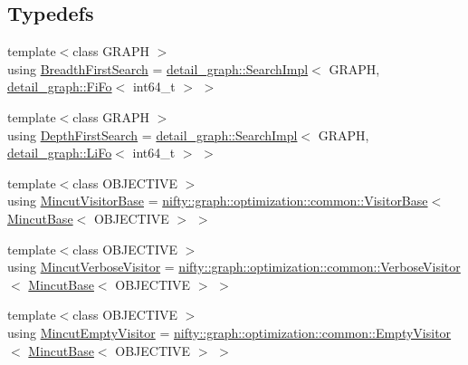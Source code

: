\subsection*{Typedefs}
\begin{DoxyCompactItemize}
\item 
{\footnotesize template$<$class G\+R\+A\+P\+H $>$ }\\using \hyperlink{namespacenifty_1_1graph_a5cdea7eb940a178738d5f7ba11b92a15}{Breadth\+First\+Search} = \hyperlink{classnifty_1_1graph_1_1detail__graph_1_1SearchImpl}{detail\+\_\+graph\+::\+Search\+Impl}$<$ G\+R\+A\+P\+H, \hyperlink{structnifty_1_1graph_1_1detail__graph_1_1FiFo}{detail\+\_\+graph\+::\+Fi\+Fo}$<$ int64\+\_\+t $>$ $>$
\item 
{\footnotesize template$<$class G\+R\+A\+P\+H $>$ }\\using \hyperlink{namespacenifty_1_1graph_a3d6d4a5216a5d0a11785373bc7537085}{Depth\+First\+Search} = \hyperlink{classnifty_1_1graph_1_1detail__graph_1_1SearchImpl}{detail\+\_\+graph\+::\+Search\+Impl}$<$ G\+R\+A\+P\+H, \hyperlink{structnifty_1_1graph_1_1detail__graph_1_1LiFo}{detail\+\_\+graph\+::\+Li\+Fo}$<$ int64\+\_\+t $>$ $>$
\item 
{\footnotesize template$<$class O\+B\+J\+E\+C\+T\+I\+V\+E $>$ }\\using \hyperlink{namespacenifty_1_1graph_abcf758110c216f393d7f20219d3fcf1b}{Mincut\+Visitor\+Base} = \hyperlink{classnifty_1_1graph_1_1optimization_1_1common_1_1VisitorBase}{nifty\+::graph\+::optimization\+::common\+::\+Visitor\+Base}$<$ \hyperlink{classnifty_1_1graph_1_1MincutBase}{Mincut\+Base}$<$ O\+B\+J\+E\+C\+T\+I\+V\+E $>$ $>$
\item 
{\footnotesize template$<$class O\+B\+J\+E\+C\+T\+I\+V\+E $>$ }\\using \hyperlink{namespacenifty_1_1graph_a12b1431afc72b38c31489d40661c163f}{Mincut\+Verbose\+Visitor} = \hyperlink{classnifty_1_1graph_1_1optimization_1_1common_1_1VerboseVisitor}{nifty\+::graph\+::optimization\+::common\+::\+Verbose\+Visitor}$<$ \hyperlink{classnifty_1_1graph_1_1MincutBase}{Mincut\+Base}$<$ O\+B\+J\+E\+C\+T\+I\+V\+E $>$ $>$
\item 
{\footnotesize template$<$class O\+B\+J\+E\+C\+T\+I\+V\+E $>$ }\\using \hyperlink{namespacenifty_1_1graph_ac52f1f3f31061d1a6130a80e7a11e0e0}{Mincut\+Empty\+Visitor} = \hyperlink{classnifty_1_1graph_1_1optimization_1_1common_1_1EmptyVisitor}{nifty\+::graph\+::optimization\+::common\+::\+Empty\+Visitor}$<$ \hyperlink{classnifty_1_1graph_1_1MincutBase}{Mincut\+Base}$<$ O\+B\+J\+E\+C\+T\+I\+V\+E $>$ $>$

\end{DoxyCompactItemize}
